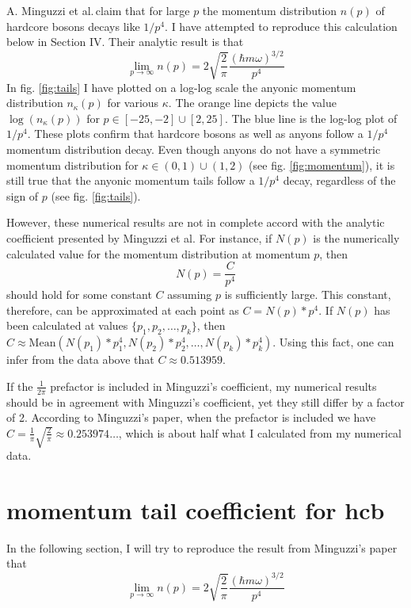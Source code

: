 \documentclass[onecolumn,english,aps,pra]{revtex4}
\begin{document}
A. Minguzzi et al.\footnotemark\,claim that for large $p$ the momentum distribution $n(p)$ of hardcore bosons decays like $1/p^4$. 
I have attempted to reproduce this calculation below in Section IV. Their analytic result is that
\[ \lim_{p \rightarrow \infty} n(p) = 2\sqrt{\frac{2}{\pi }} \frac{(\hbar m \omega)^{3/2}}{p^4}  \]
In fig. \ref{fig:tails} I have plotted on a log-log scale the anyonic momentum distribution $n_\kappa (p)$ for various $\kappa$. The orange line depicts the value $\log(n_\kappa(p))$ for $p \in [-25, -2] \cup [2,25]$. The blue line is the log-log plot of $1/p^4$. These plots confirm that hardcore bosons as well as anyons follow a $1/p^4$ momentum distribution decay. Even though anyons do not have a symmetric momentum distribution for $\kappa \in (0,1) \cup (1,2)$ (see fig. \ref{fig:momentum}), it is still true that the anyonic momentum tails follow a $1/p^4$ decay, regardless of the sign of $p$ (see fig. \ref{fig:tails}).

However, these numerical results are not in complete accord with the analytic coefficient presented by Minguzzi et al. For instance, if $N(p)$ is the numerically calculated value for the momentum distribution at momentum $p$, then
\[ N(p) = \dfrac{C}{p^4} \]
should hold for some constant $C$ assuming $p$ is sufficiently large. This constant, therefore, can be approximated at each point as $C = N(p) * p^4$. If $N(p)$ has been calculated at values $\{ p_{1},p_{2}, \ldots, p_{k} \}$, then $C \approx \text{Mean}(N(p_{1}) * p_{1}^4, N(p_{2}) * p_{2}^4, \ldots, N(p_{k}) * p_{k}^4) $. Using this fact, one can infer from the data above that $C \approx 0.513959 $. 

If the $\frac{1}{2\pi}$ prefactor is included in Minguzzi's coefficient, my numerical results should be in agreement with Minguzzi's coefficient, yet they still differ by a factor of 2. According to Minguzzi's paper, when the prefactor is included we have $C = \frac{1}{\pi} \sqrt{\frac{2}{\pi}} \approx 0.253974\ldots$, which is about half what I calculated from my numerical data.

\section{momentum tail coefficient for hcb}

In the following section, I will try to reproduce the result from Minguzzi's paper that 
\[ \lim_{p \rightarrow \infty} n(p) = 2\sqrt{\frac{2}{\pi }} \frac{(\hbar m \omega)^{3/2}}{p^4}  \]
\end{document}
